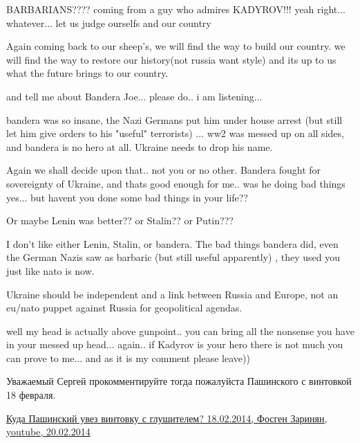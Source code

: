 \begin{itemize}
\begin{itemize}

BARBARIANS???? coming from a guy who admires KADYROV!!! yeah right... whatever... let us judge ourselfs and our country


Again coming back to our sheep's, we will find the way to build our country.
we will find the way to restore our history(not russia want style) and its up
to us what the future brings to our country.


and tell me about Bandera Joe... please do.. i am listening...


bandera was so insane, the Nazi Germans put him under house arrest (but still
let him give orders to his "useful" terrorists) ... ww2 was messed up on all
sides, and bandera is no hero at all. Ukraine needs to drop his name.


Again we shall decide upon that.. not you or no other. Bandera fought for
sovereignty of Ukraine, and thats good enough for me.. was he doing bad things
yes... but havent you done some bad things in your life??


Or maybe Lenin was better?? or Stalin?? or Putin???


I don't like either Lenin, Stalin, or bandera. The bad things bandera did, even
the German Nazis saw as barbaric (but still useful apparently) , they used you
just like nato is now.

Ukraine should be independent and a link between Russia and Europe, not an
eu/nato puppet against Russia for geopolitical agendas.


well my head is actually above gunpoint.. you can bring all the nonsense you
have in your messed up head... again.. if Kadyrov is your hero there is not much
you can prove to me... and as it is my comment please leave))


Уважаемый Сергей
прокомментируйте тогда пожалуйста Пашинского с винтовкой 18 февраля.

\href{https://www.youtube.com/watch?v=Sxmi87ILEQ4}{%
Куда Пашинский увез винтовку с глушителем? 18.02.2014, Фосген Заринян, youtube, 20.02.2014%
}


\end{itemize}
\end{itemize}
